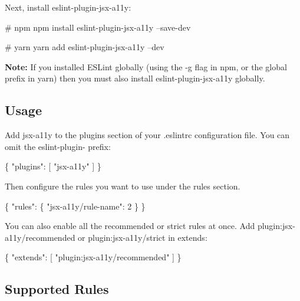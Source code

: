 Next, install {\ttfamily eslint-\/plugin-\/jsx-\/a11y}\+:


\begin{DoxyCode}
# npm
npm install eslint-plugin-jsx-a11y --save-dev

# yarn
yarn add eslint-plugin-jsx-a11y --dev
\end{DoxyCode}


{\bfseries Note\+:} If you installed E\+S\+Lint globally (using the {\ttfamily -\/g} flag in npm, or the {\ttfamily global} prefix in yarn) then you must also install {\ttfamily eslint-\/plugin-\/jsx-\/a11y} globally.

\subsection*{Usage}

Add {\ttfamily jsx-\/a11y} to the plugins section of your {\ttfamily .eslintrc} configuration file. You can omit the {\ttfamily eslint-\/plugin-\/} prefix\+:


\begin{DoxyCode}
\{
  "plugins": [
    "jsx-a11y"
  ]
\}
\end{DoxyCode}


Then configure the rules you want to use under the rules section.


\begin{DoxyCode}
\{
  "rules": \{
    "jsx-a11y/rule-name": 2
  \}
\}
\end{DoxyCode}


You can also enable all the recommended or strict rules at once. Add {\ttfamily plugin\+:jsx-\/a11y/recommended} or {\ttfamily plugin\+:jsx-\/a11y/strict} in {\ttfamily extends}\+:


\begin{DoxyCode}
\{
  "extends": [
    "plugin:jsx-a11y/recommended"
  ]
\}
\end{DoxyCode}


\subsection*{Supported Rules}


